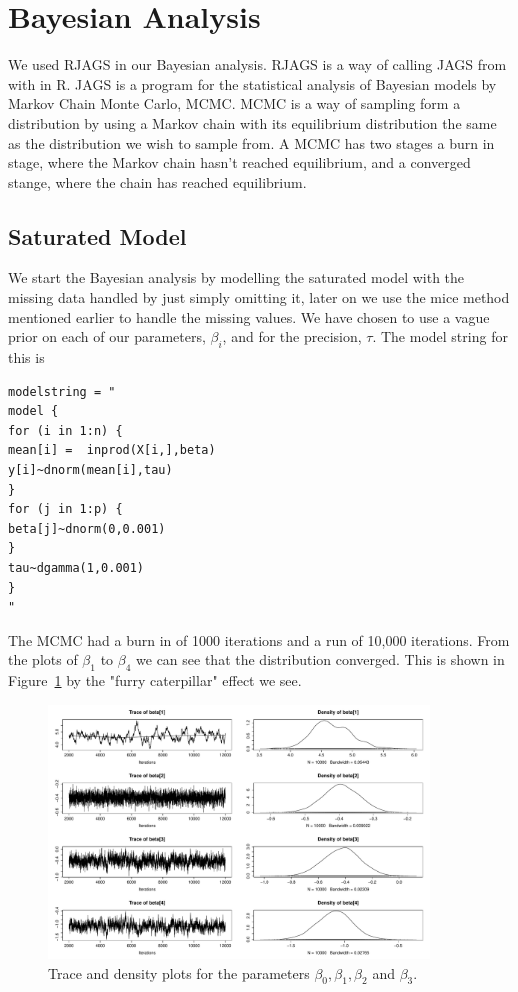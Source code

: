 \documentclass{article}
\begin{document}
\section{Bayesian Analysis}
We used RJAGS in our Bayesian analysis. RJAGS is a way of calling JAGS from with in \textsf{R}. JAGS is a program for the statistical analysis of Bayesian models by Markov Chain Monte Carlo, MCMC. MCMC is a way of sampling form a distribution by using a Markov chain with its equilibrium distribution the same as the distribution we wish to sample from. A MCMC has two stages a burn in stage, where the Markov chain hasn't reached equilibrium, and a converged stange, where the chain has reached equilibrium.
\subsection{Saturated Model}
We start the Bayesian analysis by modelling the saturated model with the missing data handled by just simply omitting it, later on we use the mice method mentioned earlier to handle the missing values. We have chosen to use a vague prior on each of our parameters, $\beta_i$, and for the precision, $\tau$. The model string  for this is 
\begin{verbatim}
modelstring = "
model {
for (i in 1:n) {
mean[i] =  inprod(X[i,],beta)
y[i]~dnorm(mean[i],tau)
}
for (j in 1:p) {
beta[j]~dnorm(0,0.001)
}
tau~dgamma(1,0.001)
}
"
\end{verbatim}
The MCMC had a burn in of 1000 iterations and a run of 10,000 iterations. From the plots of $\beta_1$ to $\beta_4$ we can see that the distribution converged. This is shown in Figure~\ref{saturated_beta1-4} by the "furry caterpillar" effect we see.
\begin{figure}[h!]
\centering
\includegraphics[width = 0.9\textwidth]{saturatedOutput/beta1-4.pdf}
\caption{Trace and density plots for the parameters $\beta_0, \beta_1, \beta_2$ and $\beta_3$.}
\label{saturated_beta1-4}
\end{figure}
\end{document}
